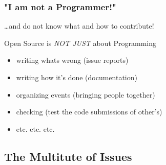 \begin{frame}
  \frametitle{"I am not a Programmer!"}
  \ldots and do not know what and how to contribute!
  \pause
  \begin{block}{Open Source is \emph{NOT JUST} about Programming}
  	\begin{itemize}[<+->]
  		\item writing whats wrong (issue reports)
  		\item writing how it's done (documentation)
  		\item organizing events (bringing people together)
  		\item checking (test the code submissions of other's)
  		\item etc. etc. etc.
  	\end{itemize}
  \end{block} 
\end{frame}

\subsection{The Multitute of Issues}


